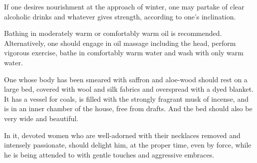 \begin{translation}
\item[30] 
If one desires nourishment at the approach of winter,  one may partake of clear alcoholic drinks and whatever gives strength, according to one’s inclination. 

\item[31--32ab] %
Bathing in moderately warm or comfortably warm oil is recommended. Alternatively, one should engage in oil massage including the head, perform vigorous exercise, bathe in comfortably warm water and wash with only warm water. 

\item[32cd--34ab] 
One whose body has been smeared with saffron and aloe-wood %
should rest %
on a large %
bed, covered with wool and silk fabrics %
and overspread with a dyed blanket. %
It has a vessel for coals, %
is filled with the strongly fragrant musk of incense, %
and is in an inner chamber of the house, %
free from drafts. %
And the bed should also be %
very wide %
and beautiful. %

\item[34cd--35] %
In it, %
devoted %
women who are well-adorned %
with their necklaces removed %
and intensely passionate, %
should delight him, %
at the proper time, %
even by force, %
while he is being attended to %
with gentle touches %
and aggressive embraces. %


\end{translation}
